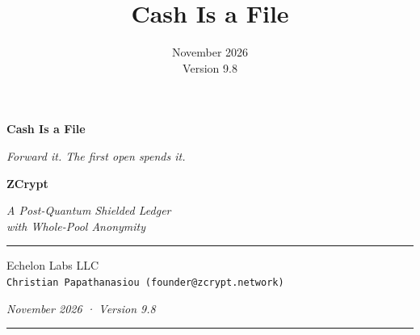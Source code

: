 \documentclass[twocolumn,10pt]{article}
\title{\bfseries Cash Is a File}
\date{November 2026\\ \small Version 9.8}
\begin{document}
\begin{titlepage}
\thispagestyle{empty}
\onecolumn

\vspace*{2.5in}
\begin{center}

{\fontsize{26pt}{32pt}\selectfont\bfseries
Cash Is a File}\par

\vspace{0.22in}

{\large\itshape
Forward it. The first open spends it.}\par

\vspace{0.35in}

{\Large\bfseries ZCrypt}\par
\vspace{6pt}
{\normalsize\mdseries\itshape
A Post-Quantum Shielded Ledger\\
with Whole-Pool Anonymity}\par

\vspace{0.4in}

{\color{zcryptrule}\rule{0.25\textwidth}{0.8pt}}\par

\vfill

\large
Echelon Labs LLC\\[4pt]
{\small\texttt{Christian Papathanasiou (founder@zcrypt.network)}}\par

\vspace{18pt}

{\small\itshape November 2026 · Version 9.8}\par

\vspace{0.4in}
{\color{zcryptrule}\rule{\textwidth}{0.5pt}}\\[6pt]

\end{center}
\end{titlepage}

\twocolumn
\end{document}
